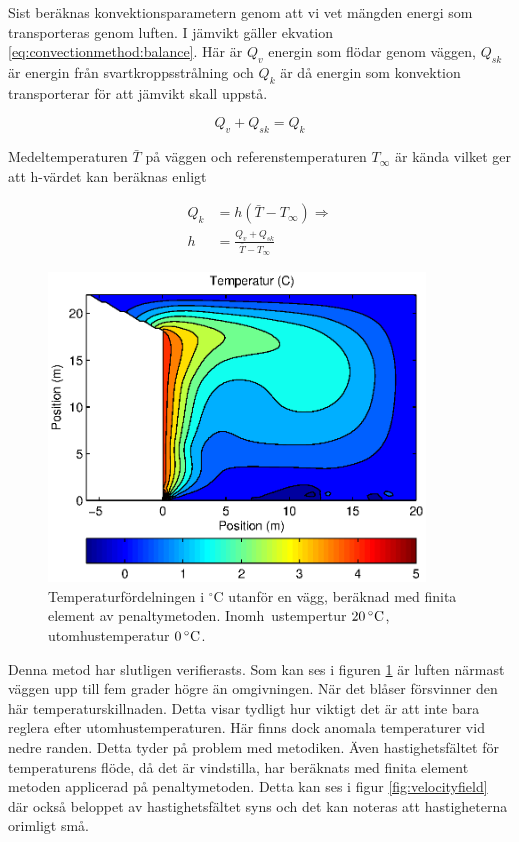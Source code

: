 Sist beräknas konvektionsparametern genom att vi vet mängden energi som transporteras
genom luften. I jämvikt gäller ekvation \eqref{eq:convectionmethod:balance}.
Här är $Q_v$ energin som flödar genom väggen, $Q_{sk}$ är energin från
svartkroppsstrålning och $Q_k$ är då energin som konvektion transporterar
för att jämvikt skall uppstå.

\begin{equation}
\label{eq:convectionmethod:balance}
Q_v + Q_{sk} = Q_k
\end{equation}

Medeltemperaturen $\bar{T}$ på väggen och referenstemperaturen $T_\infty$ är kända
vilket ger att h-värdet kan beräknas enligt

\begin{align}
Q_k &= h(\bar{T}-T_\infty) \Rightarrow \nonumber \\
h &= \frac{Q_v + Q_{sk}}{\bar{T}-T_\infty}
\end{align}


\begin{figure}[hpbt]
\centering
\includegraphics[width=10cm]{images/convectemperature.eps}
\caption{\label{fig:temp_dist}Temperaturfördelningen i $^\circ\mbox{C}$ utanför en vägg, beräknad med finita element av penaltymetoden. Inomh\
ustempertur $\unit[20]{^\circ C}$, utomhustemperatur $\unit[0]{^\circ C}$.}
\end{figure}

Denna metod har slutligen verifierasts. Som kan ses i figuren \ref{fig:temp_dist} är luften närmast väggen upp till fem grader
högre än omgivningen. När det blåser försvinner den här temperaturskillnaden. Detta
visar tydligt hur viktigt det är att inte bara reglera efter utomhustemperaturen.
Här finns dock anomala temperaturer vid nedre randen. Detta tyder på problem med
metodiken.
Även hastighetsfältet för temperaturens flöde, då det är vindstilla, har beräknats med finita element metoden
applicerad på penaltymetoden. Detta kan ses i figur \ref{fig:velocityfield} där också
beloppet av hastighetsfältet syns och det kan noteras att hastigheterna orimligt små.

